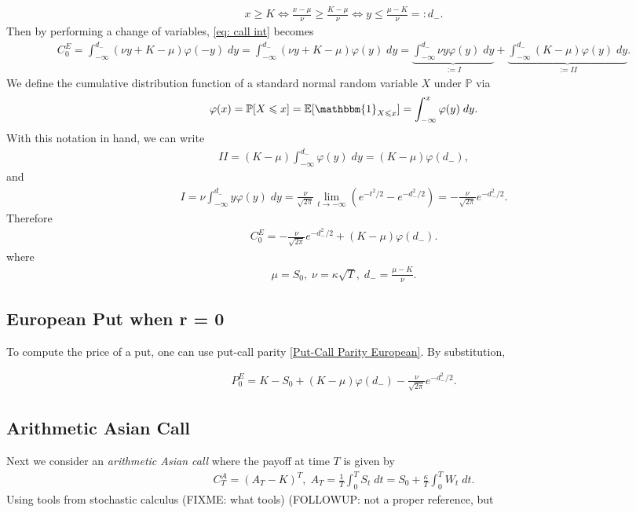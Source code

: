 \documentclass[reqno]{amsart}
\begin{document}
\begin{align}
	 x \ge K \Longleftrightarrow \frac{x-\mu}{\nu} \ge \frac{K - \mu}{\nu} \Longleftrightarrow y \le \frac{\mu - K}{\nu} =: d_-.
\end{align}
Then by performing a change of variables, \eqref{eq: call int} becomes 
\begin{align}
	 C^E_0 = \int_{-\infty}^{d_-} (\nu y + K - \mu) \varphi(-y) \; dy = \int_{-\infty}^{d_-} (\nu y + K - \mu) \varphi(y) \; dy = \underbrace{\int_{-\infty}^{d_-} \nu y \varphi(y) \; dy}_{:= I} + \underbrace{\int_{-\infty}^{d_-}  (K-\mu)\varphi(y) \; dy}_{:= II}.
\end{align}
We define the cumulative distribution function of a standard normal random variable $X$ under $\mathbb{P}$ via 
\begin{align}
	 \varphi(x) = \mathbb{P}[X \le x] = \E[ \mathbbm{1}_{X \le x}] = \int_{-\infty}^x \varphi(y) \; dy.
\end{align}
With this notation in hand, we can write 
\begin{align}
	 II = (K-\mu) \int_{-\infty}^{d_-} \varphi(y) \; dy = (K-\mu) \varphi(d_-),
\end{align}
and 
\begin{align}
	 I = \nu \int_{-\infty}^{d_-} y \varphi(y) \; dy =  \frac{\nu}{\sqrt{2\pi}} \lim_{t \to -\infty} (e^{-t^2/2} - e^{-d_-^2/2}) = -\frac{\nu}{\sqrt{2\pi}} e^{-d_-^2/2}.
\end{align}
Therefore 
\begin{align}
	 C^E_0 =  -\frac{\nu}{\sqrt{2\pi}} e^{-d_-^2/2} + (K-\mu) \varphi(d_-).
\end{align}
where 
\begin{align}
	 \mu = S_0, \; \nu = \kappa \sqrt{T}, \; d_- = \frac{\mu - K}{\nu}.
\end{align}

\subsection{European Put when r = 0}
To compute the price of a put, one can use put-call parity \eqref{Put-Call Parity European}. 
By substitution, 

\begin{align}
     P^E_0 = K - S_0 + (K-\mu) \varphi(d_-) - \frac{\nu}{\sqrt{2\pi}} e^{-d_-^2/2}.
\end{align}

\subsection{Arithmetic Asian Call}
Next we consider an \emph{arithmetic Asian call} where the payoff at time $T$ is given by 
\begin{align} \label{eq: asian}
	 C^A_T = (A_T - K)^T, \; A_T = \frac{1}{T}\int_0^T S_t \; dt = S_0 + \frac{\kappa}{T} \int_0^T W_t \; dt. 
\end{align}
Using tools from stochastic calculus (FIXME: what tools) (FOLLOWUP: not a proper reference, but 
\end{document}
